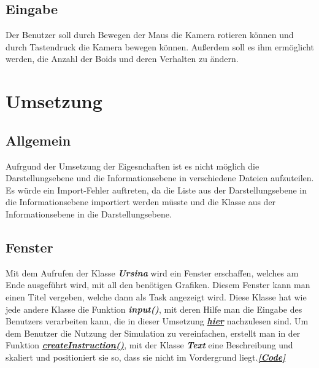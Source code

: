 \documentclass[a4paper, hidelinks, 12pt]{article}
\begin{document}
\subsection{Eingabe}
Der Benutzer soll durch Bewegen der Maus die Kamera rotieren können und durch Tastendruck die Kamera bewegen können. Außerdem soll es ihm ermöglicht werden, die Anzahl der Boids und deren Verhalten zu ändern.
\newpage
	
	
	
\section{Umsetzung}
\subsection{Allgemein}
Aufrgund der Umsetzung der Eigesnchaften ist es nicht möglich die Darstellungsebene und die Informationsebene in verschiedene Dateien aufzuteilen. Es würde ein Import-Fehler auftreten, da die Liste aus der Darstellungsebene in die Informationsebene importiert werden müsste und die Klasse aus der Informationsebene in die Darstellungsebene.
	
\subsection{Fenster}\label{sec:Fenster}
Mit dem Aufrufen der Klasse \textbf{\emph{Ursina}}\cite{2022m} wird ein Fenster erschaffen, welches am Ende ausgeführt wird, mit all den benötigen Grafiken\cite{2022q}. Diesem Fenster kann man einen Titel vergeben, welche dann als Task angezeigt wird\cite{2022q}. Diese Klasse hat wie jede andere Klasse\cite{2022} die Funktion \textbf{\emph{input()}}, mit deren Hilfe man die Eingabe des Benutzers verarbeiten kann, die in dieser Umsetzung \hyperref[sec:input]{\textbf{\emph{hier}}} nachzulesen sind. Um dem Benutzer die Nutzung der Simulation zu vereinfachen, erstellt man in der Funktion \hyperref[CodeCreateInstructions]{\textbf{\emph{createInstruction()}}}, mit der Klasse \textbf{\emph{Text}} eine Beschreibung und skaliert und positioniert sie so, dass sie nicht im Vordergrund liegt\cite{text}.\hyperref[CodeFenster]{\textbf{\emph{[Code]}}}
\end{document}
